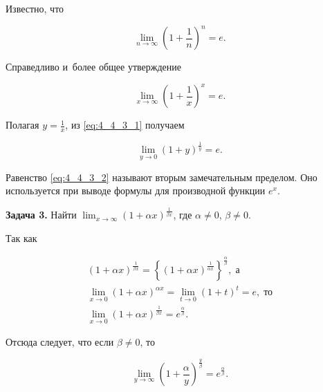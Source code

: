 
Известно, что

\begin{equation*}
\displaystyle \lim_{n \to \infty} \left( 1+ \frac{1}{n} \right)^{n} = e.
\end{equation*}

\noindent
Справедливо и~более общее утверждение

\begin{equation}\label{eq:4_4_3_1}
\displaystyle \lim_{x \to \infty} \left( 1 + \frac{1}{x} \right)^{x} = e.
\end{equation}

\noindent
Полагая $\displaystyle y = \frac{1}{x}$, из \eqref{eq:4_4_3_1} получаем

\begin{equation}\label{eq:4_4_3_2}
\displaystyle \lim_{y \to 0} \left( 1 + y \right)^{\frac{1}{y}} = e.
\end{equation}

\noindent
Равенство \eqref{eq:4_4_3_2} называют вторым замечательным пределом.
Оно используется при выводе формулы для производной функции $e^{x}$.

\textbf{Задача 3.}\label{ex:4_4_3_3} Найти
$\displaystyle \lim_{x \to \infty} \left( 1 + \alpha x \right)^{\frac{1}{\beta x}}$,
где $\alpha \ne 0$, $\beta \ne 0$.

Так как

\begin{gather*}
\left(
  1 + \alpha x
\right)^{\frac{1}{\beta x}} =
\left\{
  \left(
    1 + \alpha x
  \right)^{\frac{1}{\alpha x}}
\right\}^{\frac{\alpha}{\beta}}, \; \text{а} \\
\displaystyle
\lim_{x \to 0} 
  \left(
    1 + \alpha x
  \right)^{\alpha x} =
\lim_{t \to 0}
  \left(
    1 + t
  \right)^{t} = e, \; \text{то} \\
\displaystyle
\lim_{x \to 0}
  \left(
    1 + \alpha x
  \right)^{\frac{1}{\beta x}} =
e^{\frac{\alpha}{\beta}}.
\end{gather*}

\begin{Note} Отсюда следует, что если $\beta \ne 0$, то

\begin{equation*}
\displaystyle
\lim_{y \to \infty}
  \left(
    1 + \frac{\alpha}{y}
  \right)^{\frac{y}{\beta}} =
  e^{\frac{\alpha}{\beta}}.
\end{equation*}

\end{Note}

